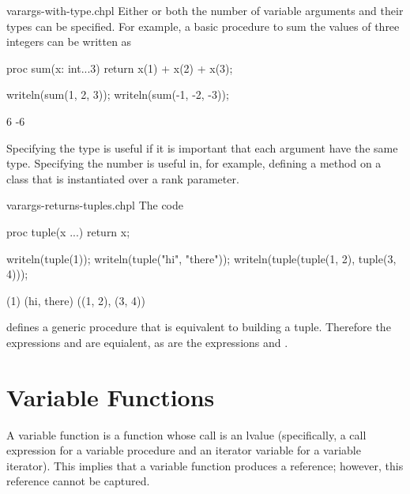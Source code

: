 \begin{chapelexample}{varargs-with-type.chpl}
Either or both the number of variable arguments and their types can be
specified.  For example, a basic procedure to sum the values of three
integers can be written as
\begin{chapel}
proc sum(x: int...3) return x(1) + x(2) + x(3);
\end{chapel}
\begin{chapelpost}
writeln(sum(1, 2, 3));
writeln(sum(-1, -2, -3));
\end{chapelpost}
\begin{chapeloutput}
6
-6
\end{chapeloutput}
Specifying the type is useful if it is important that each argument
have the same type.  Specifying the number is useful in, for example,
defining a method on a class that is instantiated over a rank
parameter.
\end{chapelexample}

\begin{chapelexample}{varargs-returns-tuples.chpl}
The code
\begin{chapel}
proc tuple(x ...) return x;
\end{chapel}
\begin{chapelpost}
writeln(tuple(1));
writeln(tuple("hi", "there"));
writeln(tuple(tuple(1, 2), tuple(3, 4)));
\end{chapelpost}
\begin{chapeloutput}
(1)
(hi, there)
((1, 2), (3, 4))
\end{chapeloutput}
defines a generic procedure that is equivalent to building a tuple.
Therefore the expressions  and  are equialent,
as are the expressions  and .
\end{chapelexample}


\section{Variable Functions}
\label{Variable_Functions}

A variable function is a function whose call is an lvalue
(specifically, a call expression for a variable procedure and
an iterator variable for a variable iterator).
This implies that a variable function produces a reference;
however, this
reference cannot be captured.

